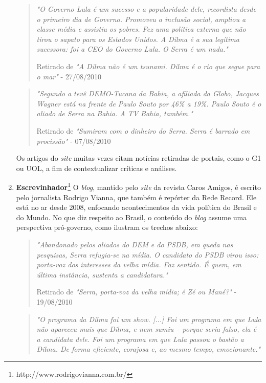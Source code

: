 \begin{enumerate}
\begin{quote}

\emph{"O Governo Lula é um sucesso e a popularidade dele, recordista desde o primeiro dia de Governo. Promoveu a inclusão social, ampliou a classe média e assistiu os pobres. Fez uma política externa que não tirou o sapato para os Estados Unidos. A Dilma é a sua legítima sucessora: foi a CEO do Governo Lula. O Serra é um nada."}

{\small Retirado de \emph{"A Dilma não é um tsunami. Dilma é o rio que segue para o mar"} - 27/08/2010}
\end{quote}

\begin{quote}

\emph{"Segundo a tevê DEMO-Tucana da Bahia, a afiliada da Globo, Jacques Wagner está na frente de Paulo Souto por 46\% a 19\%. Paulo Souto é o aliado de Serra na Bahia. A TV Bahia, também."}

{\small Retirado de \emph{"Sumiram com o dinheiro do Serra. Serra é barrado em procissão"} - 07/08/2010}
\end{quote}

Os artigos do \emph{site} muitas vezes citam notícias retiradas de portais, como o G1 ou UOL, a fim de contextualizar críticas e análises. 

\item \textbf{Escrevinhador}\footnote{http://www.rodrigovianna.com.br/} O \emph{blog}, mantido pelo \emph{site} da revista Caros Amigos, é escrito pelo jornalista Rodrigo Vianna, que também é repórter da Rede Record. Ele está no ar desde 2008, enfocando acontecimentos da vida política do Brasil e do Mundo. No que diz respeito ao Brasil, o conteúdo do \emph{blog} assume uma perspectiva pró-governo, como ilustram os trechos abaixo:

\begin{quote}

\emph{"Abandonado pelos aliados do DEM e do PSDB, em queda nas pesquisas, Serra refugia-se na mídia. O candidato do PSDB virou isso: porta-voz dos interesses da velha mídia. Faz sentido. É quem, em última instância, sustenta a candidatura."}

{\small Retirado de \emph{"Serra, porta-voz da velha mídia; é Zé ou Mané?"} - 19/08/2010}
\end{quote}

\begin{quote}
\emph{"O programa da Dilma foi um show. [...] Foi um programa em que Lula não apareceu mais que Dilma, e nem sumiu – porque seria falso, ela é a candidata dele. Foi um programa em que Lula passou o bastão a Dilma. De forma eficiente, corajosa e, ao mesmo tempo, emocionante."}


\end{quote}
\end{enumerate}

